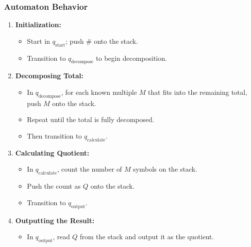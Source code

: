 \documentclass[11pt]{article}
\begin{document}
\subsubsection*{Automaton Behavior}
\begin{enumerate}
    \item \textbf{Initialization:}  
    \begin{itemize}
        \item Start in \(q_{\text{start}}\); push \(\#\) onto the stack.
        \item Transition to \(q_{\text{decompose}}\) to begin decomposition.
    \end{itemize}
    \item \textbf{Decomposing Total:}  
    \begin{itemize}
        \item In \(q_{\text{decompose}}\), for each known multiple \(M\) that fits into the remaining total, push \(M\) onto the stack.
        \item Repeat until the total is fully decomposed.
        \item Then transition to \(q_{\text{calculate}}\).
    \end{itemize}
    \item \textbf{Calculating Quotient:}  
    \begin{itemize}
        \item In \(q_{\text{calculate}}\), count the number of \(M\) symbols on the stack.
        \item Push the count as \(Q\) onto the stack.
        \item Transition to \(q_{\text{output}}\).
    \end{itemize}
    \item \textbf{Outputting the Result:}  
    \begin{itemize}
        \item In \(q_{\text{output}}\), read \(Q\) from the stack and output it as the quotient.
    \end{itemize}
\end{enumerate}
\end{document}
